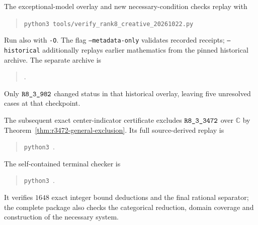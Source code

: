 The exceptional-model overlay and new necessary-condition checks replay with
\begin{quote}\small\verb|python3 tools/verify_rank8_creative_20261022.py|\end{quote}
Run also with \texttt{-O}. The flag \texttt{--metadata-only} validates
recorded receipts; \texttt{--historical} additionally replays earlier
mathematics from the pinned historical archive. The separate archive is
\begin{quote}\small{}.\end{quote}
Only $\sha{R8_3_982}$ changed status in that historical overlay, leaving
five unresolved cases at that checkpoint.

The subsequent exact center-indicator certificate excludes
$\sha{R8_3_3472}$ over $\mathbb C$ by
Theorem~\ref{thm:r3472-general-exclusion}. Its full source-derived replay is
\begin{quote}\small
\texttt{python3 }.
\end{quote}
The self-contained terminal checker is
\begin{quote}\small
\texttt{python3 }.
\end{quote}
It verifies $1648$ exact integer bound deductions and the final rational
separator; the complete package also checks the categorical reduction,
domain coverage and construction of the necessary system.
